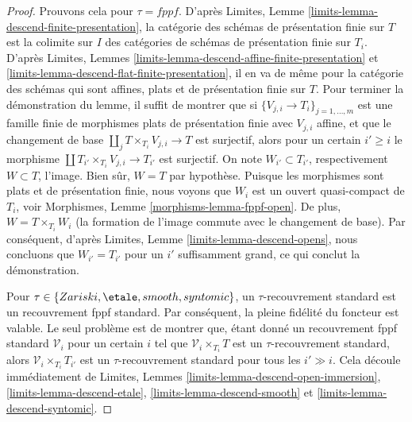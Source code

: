 \begin{proof}
Prouvons cela pour $\tau = fppf$. D'après Limites, Lemme \ref{limits-lemma-descend-finite-presentation}, la catégorie des schémas de présentation finie sur $T$ est la colimite sur $I$ des catégories de schémas de présentation finie sur $T_i$. D'après Limites, Lemmes \ref{limits-lemma-descend-affine-finite-presentation} et \ref{limits-lemma-descend-flat-finite-presentation}, il en va de même pour la catégorie des schémas qui sont affines, plats et de présentation finie sur $T$. Pour terminer la démonstration du lemme, il suffit de montrer que si $\{V_{j, i} \to T_i\}_{j = 1, \ldots, m}$ est une famille finie de morphismes plats de présentation finie avec $V_{j, i}$ affine, et que le changement de base $\coprod_j T \times_{T_i} V_{j, i} \to T$ est surjectif, alors pour un certain $i' \geq i$ le morphisme $\coprod T_{i'} \times_{T_i} V_{j, i} \to T_{i'}$ est surjectif. On note $W_{i'} \subset T_{i'}$, respectivement $W \subset T$, l'image. Bien sûr, $W = T$ par hypothèse. Puisque les morphismes sont plats et de présentation finie, nous voyons que $W_i$ est un ouvert quasi-compact de $T_i$, voir Morphismes, Lemme \ref{morphisms-lemma-fppf-open}. De plus, $W = T \times_{T_i} W_i$ (la formation de l'image commute avec le changement de base). Par conséquent, d'après Limites, Lemme \ref{limits-lemma-descend-opens}, nous concluons que $W_{i'} = T_{i'}$ pour un $i'$ suffisamment grand, ce qui conclut la démonstration.

\medskip\noindent
Pour $\tau \in \{Zariski, \etale, smooth, syntomic\}$, un $\tau$-recouvrement standard est un recouvrement fppf standard. Par conséquent, la pleine fidélité du foncteur est valable. Le seul problème est de montrer que, étant donné un recouvrement fppf standard $\mathcal{V}_i$ pour un certain $i$ tel que $\mathcal{V}_i \times_{T_i} T$ est un $\tau$-recouvrement standard, alors $\mathcal{V}_i \times_{T_i} T_{i'}$ est un $\tau$-recouvrement standard pour tous les $i' \gg i$. Cela découle immédiatement de Limites, Lemmes \ref{limits-lemma-descend-open-immersion}, \ref{limits-lemma-descend-etale}, \ref{limits-lemma-descend-smooth} et \ref{limits-lemma-descend-syntomic}.
\end{proof}


